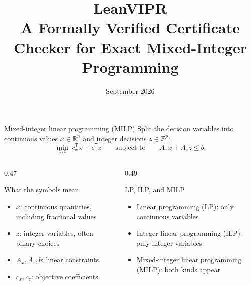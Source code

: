 \documentclass[aspectratio=169,11pt]{beamer}
\title{LeanVIPR\\
A Formally Verified Certificate Checker for Exact Mixed-Integer Programming}
\author{}
\date{September 2026}
\begin{document}
\begin{frame}
  \titlepage
\end{frame}

\begin{frame}{Mixed-integer linear programming (MILP)}
  Split the decision variables into continuous values
  $x\in\mathbb{R}^{n}$ and integer decisions $z\in\mathbb{Z}^{p}$:
  \[
    \min_{x,z}\; c_x^\mathsf{T}x+c_z^\mathsf{T}z
    \qquad\text{subject to}\qquad
    A_xx+A_zz\leq b.
  \]

  \begin{columns}[T]
    \begin{column}{0.47\textwidth}
      \begin{block}{What the symbols mean}
        \begin{itemize}
          \item $x$: continuous quantities, including fractional values
          \item $z$: integer variables, often binary choices
          \item $A_x,A_z,b$: linear constraints
          \item $c_x,c_z$: objective coefficients
        \end{itemize}
      \end{block}
    \end{column}
    \begin{column}{0.49\textwidth}
      \begin{block}{LP, ILP, and MILP}
        \begin{itemize}
          \item Linear programming (LP): only continuous variables
          \item Integer linear programming (ILP): only integer variables
          \item Mixed-integer linear programming (MILP): both kinds appear
        \end{itemize}
      \end{block}
    \end{column}
  \end{columns}
\end{frame}
\end{document}
